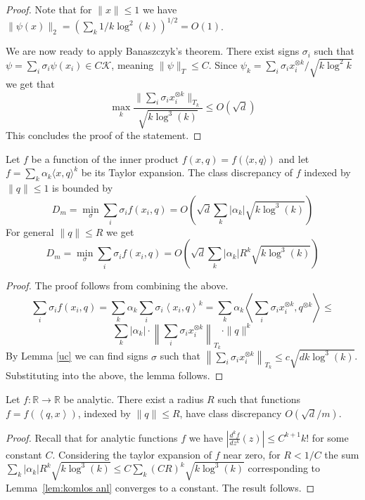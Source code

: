 \documentclass[12pt]{colt2019} %
\newcommand{\ip}[1]{\left \langle #1 \right \rangle}
\newcommand{\R}{\mathbb{R}}
\begin{document}
\begin{proof}
\noindent Note that for $\|x\| \le 1$ we have $\|\psi(x)\|_2 = (\sum_k  1/k\log^2(k))^{1/2} = O(1)$.


We are now ready to apply Banaszczyk's theorem. 
There exist signs $\sigma_i$ such that $\psi  = \sum_i \sigma_i \psi(x_i) \in C \mathcal K$, meaning $\|\psi\|_T \leq C$.
Since $\psi_k = \sum_i \sigma_i x_i^{\otimes k}/\sqrt{k \log^2{k}}$ we get that 
$$\max_k \frac{\|\sum_i \sigma_i  x_i^{\otimes k}\|_{T_k}}{\sqrt{k \log^{3}(k)}} \le O\left( \sqrt{d} \right)$$
This concludes the proof of the statement.
\end{proof}

\begin{lemma} \label{lem:komlos anl}
Let $f$ be a function of the inner product $f(x,q) = f(\langle x,q\rangle)$ and let $f = \sum_k \alpha_k \langle x,q\rangle^k$ be its Taylor expansion. 
The class discrepancy of $f$ indexed by $\|q\| \leq 1$ is bounded by
\[
D_m = \min_\sigma \sum_i \sigma_i f(x_i,q) =O\left( \sqrt{d} \sum_k  |\alpha_k|\sqrt{k\log^3(k)}\right)
\]
For general $\|q\| \leq R$ we get
\[
D_m = \min_\sigma \sum_i \sigma_i f(x_i,q) =O\left( \sqrt{d} \sum_k  |\alpha_k| R^k \sqrt{ k\log^3(k)}\right)
\]
\end{lemma}
\begin{proof}
The proof follows from combining the above.
$$
\sum_i \sigma_i f(x_i,q) = \sum_k \alpha_k \sum_i \sigma_i \ip{ x_i,q}^k =  \sum_k \alpha_k  \ip{  \sum_i \sigma_i x_i^{\otimes k},q^{\otimes k}} \le $$
$$\sum_k |\alpha_k| \cdot \left\| \sum_i \sigma_i x_i^{\otimes k}\right\|_{T_k} \cdot \|q\|^k
$$
By Lemma \ref{uc} we can find signs $\sigma$ such that 
$\left\| \sum_i \sigma_i x_i^{\otimes k}\right\|_{T_k} \le c\sqrt{d k \log^3(k)}$. Substituting into the above, the lemma follows.
\end{proof}

\begin{theorem}\label{analitic1}
Let $f:\R\rightarrow\R$ be analytic. There exist a radius $R$ such that functions $f = f(\ip{q,x})$, indexed by $\|q\| \leq R$, have class discrepancy $O(\sqrt{d}/m)$. 
\end{theorem}
\begin{proof}
Recall that for analytic functions $f$ we have $\left| \frac{d^k f}{dz^k}(z) \right|  \leq C^{k+1} k! $
for some constant $C$. Considering the taylor expansion of $f$ near zero, for $R < 1/C$ the sum
$ \sum_k  |\alpha_k| R^k \sqrt{ k\log^3(k)} \leq C \sum_k  (CR)^k \sqrt{ k\log^3(k)}$
corresponding to Lemma~\ref{lem:komlos anl} converges to a constant. The result follows.
\end{proof}
\end{document}
